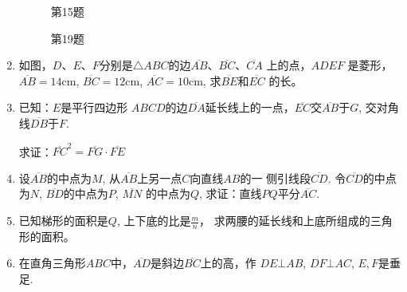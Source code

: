 \begin{enumerate}
\begin{figure}[htp]\centering
    \begin{minipage}[t]{0.48\textwidth}
    \centering
{}
    \caption*{第15题}
    \end{minipage}
    \begin{minipage}[t]{0.48\textwidth}
    \centering
    \caption*{第19题}
    \end{minipage}
    \end{figure}

\item 如图，$D$、$E$、$F$分别是$\triangle ABC$的边$\overline{AB}$、$\overline{BC}$、$\overline{CA}$
上的点，$ADEF$
是菱形，$\overline{AB}=14$cm, $\overline{BC}=12$cm, $\overline{AC}=10$cm, 求$\overline{BE}$和$\overline{EC}$
的长。

\item 已知：$E$是平行四边形
$ABCD$的边$\overline{DA}$延长线上的一点，$\overline{EC}$交$\overline{AB}$于$G$, 交对角线$\overline{DB}$于$F$.

求证：$\overline{FC}^2=\overline{FG}\cdot \overline{FE}$
\item 设$\overline{AB}$的中点为$M$, 从$\overline{AB}$上另一点$C$向直线$AB$的一
侧引线段$\overline{CD}$. 令$\overline{CD}$的中点为$N$, $\overline{BD}$的中点为$P$, $\overline{MN}$
的中点为$Q$, 求证：直线$PQ$平分$\overline{AC}$.
\item 已知梯形的面积是$Q$, 上下底的比是$\frac{m}{n}$，
求两腰的延长线和上底所组成的三角形的面积。
\item 在直角三角形$ABC$中，$\overline{AD}$是斜边$\overline{BC}$上的高，作
$DE\bot AB$, $DF\bot AC$, $E,F$是垂足.


\end{enumerate}
